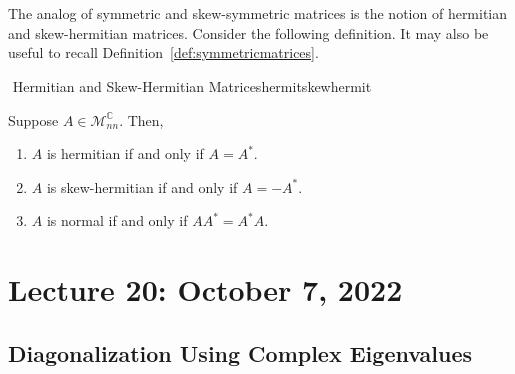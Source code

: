        \vphantom
        \\
        \\
        The analog of symmetric and skew-symmetric matrices is the notion of hermitian and skew-hermitian matrices. Consider the following definition. It may also be useful to recall Definition~\ref{def:symmetricmatrices}.
        \begin{definition}{\Stop\,\,Hermitian and Skew-Hermitian Matrices}{hermitskewhermit}

            Suppose \(A\in\mathcal{M}_{nn}^\mathbb{C}\). Then,
            \begin{enumerate}
                \item \(A\) is hermitian if and only if \(A=A^*\).
                \item \(A\) is skew-hermitian if and only if \(A=-A^*\).
                \item \(A\) is normal if and only if \(AA^*=A^*A\).
            \end{enumerate}
            
        \end{definition}

\pagebreak

\section{Lecture 20: October 7, 2022}

    \subsection{Diagonalization Using Complex Eigenvalues}

